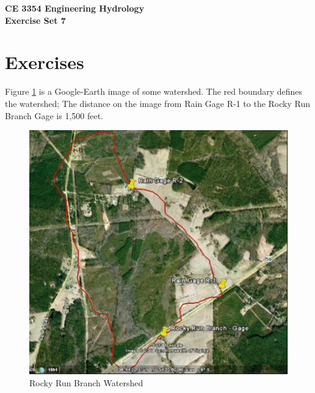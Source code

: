 \documentclass[12pt]{article}
\begin{document}
\begin{center}
{\textbf{{ CE 3354 Engineering Hydrology} \\ {Exercise Set 7}}}
\end{center}

 \section*{\small{Exercises}}
Figure \ref{fig:RockyRun} is a Google-Earth image of some watershed.  The red boundary defines the watershed;  The distance on the image from Rain Gage R-1 to the Rocky Run Branch Gage is 1,500 feet.

\begin{figure}[h!] %
   \centering
   \includegraphics[width=5.0in]{RockyRun.jpg} 
   \caption{Rocky Run Branch Watershed}
   \label{fig:RockyRun}
\end{figure}
\end{document}
